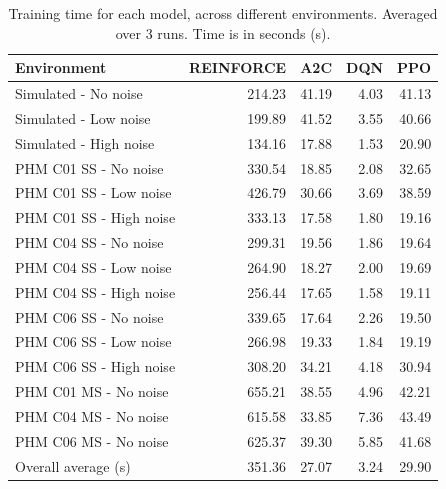 \documentclass[a4paper, 12pt]{article}
\newcommand{\rowspace}[1]{\renewcommand{\arraystretch}{#1}}
\begin{document}
\begin{table}[hbt!]\centering
	\sffamily
	\rowspace{1.3}
	\begin{tabular}{@{}l r r r r@{}}
		\arrayrulecolor{black!40}\toprule
		\textbf{Environment} &\textbf{REINFORCE} &\textbf{A2C}&\textbf{DQN}&\textbf{PPO}\\ \midrule
		Simulated  - No noise &214.23 &41.19&4.03&41.13\\
		Simulated  - Low noise &199.89 &41.52&3.55&40.66\\
		Simulated  - High noise &134.16 &17.88&1.53&20.90\\ \midrule
		
		PHM C01 SS - No noise &330.54 &18.85&2.08&32.65\\
		PHM C01 SS - Low noise &426.79 &30.66&3.69&38.59\\
		PHM C01 SS - High noise &333.13 &17.58&1.80&19.16\\ \midrule
		
		PHM C04 SS - No noise &299.31 &19.56&1.86&19.64\\
		PHM C04 SS - Low noise &264.90 &18.27&2.00&19.69\\
		PHM C04 SS - High noise &256.44 &17.65&1.58&19.11\\ \hdashline
		
		PHM C06 SS - No noise &339.65 &17.64&2.26&19.50\\
		PHM C06 SS - Low noise &266.98 &19.33&1.84&19.19\\
		PHM C06 SS - High noise &308.20 &34.21&4.18&30.94\\ \hdashline
		
		PHM C01 MS - No noise &655.21 &38.55&4.96&42.21\\
		PHM C04 MS - No noise &615.58 &33.85&7.36&43.49\\
		PHM C06 MS - No noise &625.37 &39.30&5.85&41.68\\  \midrule
		
		Overall average (s) &351.36 &27.07&3.24&29.90\\
		\bottomrule
\end{tabular}
\caption{Training time for each model, across different environments. Averaged over 3 runs. Time is in seconds (s).}
\label{tbl:TrainingTimes}
\end{table}

\end{document}
